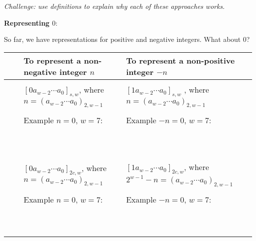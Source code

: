 \documentclass[12pt, oneside]{article}
\begin{document}
{\it Challenge: use definitions to explain why
each of these approaches works.} \newpage


{\bf Representing $0$}:

So far, we have representations for
positive and negative integers. What about $0$?

\begin{tabular}{|cc|p{3.4in}|p{3.7in}|}
   \hline
   & & To  represent a {\bf non-negative} integer $n$ & To represent a {\bf non-positive} integer $-n$\\
   \hline
   && &  \\
   &\parbox[t]{2mm}{} &
   $[ 0a_{w-2} \cdots a_0]_{s,w}$, where $n =  (a_{w-2} \cdots a_0)_{2,w-1}$& 
   $[1a_{w-2} \cdots a_0]_{s,w}$
   , where $n =  (a_{w-2} \cdots a_0)_{2,w-1}$\\
   && & \\
   && Example $n=0$, $w=7$:  & Example $-n=0$, $w=7$: \\
   && & \\
   && & \\
   && & \\
   && & \\
   && & \\
   && & \\
   && & \\
   && & \\
   && & \\
   && & \\
\hline
   &&  &  \\
   &\parbox[t]{2mm}{} &
   $[0a_{w-2} \cdots a_0]_{2c,w}$, where $n =  (a_{w-2} \cdots a_0)_{2,w-1}$& $[1a_{w-2} \cdots a_0]_{2c,w}$, where $2^{w-1} - n =  (a_{w-2} \cdots a_0)_{2,w-1}$\\
   && & \\
   && Example $n=0$, $w=7$:  & Example $-n=0$, $w=7$: \\
   && & \\
   && & \\
   && & \\
   && & \\
   && & \\
   && & \\
   && & \\
   && & \\
   && & \\
   && & \\
\hline
\end{tabular} \newpage
\end{document}
